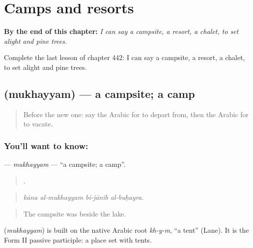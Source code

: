 
\chapter{Camps and resorts}
\label{ch:ar-camps-and-resorts}

\begin{chapteropening}
\textbf{By the end of this chapter:} \emph{I can say a campsite, a resort, a chalet, to set alight and pine trees.}

Complete the last lesson of chapter 442: I can say a campsite, a resort, a chalet, to set alight and pine trees.
\end{chapteropening}

\section[\texorpdfstring{\ar{مخيم} (mukhayyam)}{مخيم (mukhayyam)}]{ (mukhayyam) — a campsite; a camp}

\label{lesson:AR-C442-mukhayyam}



\begin{quote}
Before the new one: say the Arabic for to depart from, then the Arabic for to vacate.
\end{quote}

\subsection*{You'll want to know: }
\textbf{} — \emph{mukhayyam} — \textquotedblleft{}a campsite; a camp\textquotedblright{}.

\begin{quote}
   .
\end{quote}

\begin{quote}
\emph{kāna al-mukhayyam bi-jānib al-buḥayra.}
\end{quote}

\begin{quote}
The campsite was beside the lake.
\end{quote}

\begin{cousinweb}
\textbf{} (\emph{mukhayyam}) is built on the native Arabic root \emph{kh-y-m}, \textquotedblleft{}a tent\textquotedblright{} (Lane). It is the Form II passive participle: a place set with tents.
\end{cousinweb}

